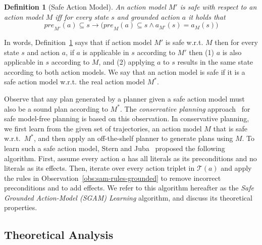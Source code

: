 \documentclass{article}
\newtheorem{definition}{Definition}
\newcommand{\pre}{\textit{pre}}
\newcommand{\realm}{\ensuremath{M^*}\xspace}
\begin{document}
\begin{definition}[Safe Action Model]
\label{def:safe_action_model}
An action model $M'$ is safe with respect to an action model $M$ iff for every state $s$ 
and grounded action $a$ %
it holds that
\begin{equation}
    \pre_{M'}(a)\subseteq s \rightarrow 
    \Big(\pre_M(a)\subseteq s \wedge 
    a_{M'}(s)=a_M(s)\Big)
    \label{eq:safe_action_model}
\end{equation}
\end{definition}
\noindent
In words, Definition~\ref{def:safe_action_model} says that if action model $M'$ is safe w.r.t. $M$ then 
for every state $s$ and action $a$, if $a$ is applicable in $s$ according to $M'$ then
(1) $a$ is also applicable in $s$ according to $M$, 
and (2) applying $a$ to $s$ results in the same state according to both action models. 
We say that an action model is safe if it is a safe action model w.r.t. the real action model \realm. 


Observe that any plan generated by a planner given a safe action model
must also be a sound plan according to \realm. 
The \emph{conservative planning} approach~\cite{stern2017efficientAndSafe} for safe model-free planning is based on this observation. 
In conservative planning, we first learn from the given set of trajectories, an action model $M$ that is safe w.r.t.\ \realm, and then apply an off-the-shelf planner to generate plans using $M$. 
To learn such a safe action model, 
Stern and Juba~ proposed the following algorithm. 
First, assume every action $a$ has all literals as its preconditions and no literals as its effects. 
Then, iterate over every action triplet in $\mathcal{T}(a)$ 
and apply the rules in Observation~\ref{obs:sam-rules-grounded} to remove incorrect preconditions and to add effects. 
We refer to this algorithm hereafter as the \emph{Safe Grounded Action-Model (SGAM) Learning} algorithm, and discuss its theoretical properties. 

\subsection{Theoretical Analysis}
\end{document}
